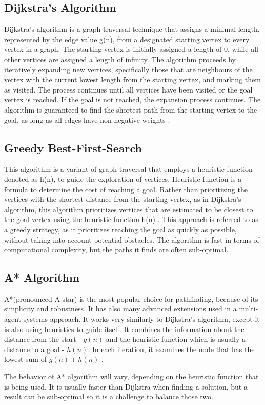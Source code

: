 \subsection{Dijkstra's Algorithm}
Dijkstra's algorithm is a graph traversal technique that assigns a minimal length, represented by the edge value g(n), from a designated starting vertex to every vertex in a graph. The starting vertex is initially assigned a length of 0, while all other vertices are assigned a length of infinity. The algorithm proceeds by iteratively expanding new vertices, specifically those that are neighbours of the vertex with the current lowest length from the starting vertex, and marking them as visited. The process continues until all vertices have been visited or the goal vertex is reached. If the goal is not reached, the expansion process continues. The algorithm is guaranteed to find the shortest path from the starting vertex to the goal, as long as all edges have non-negative weights \cite{basic_algorithms, basic_2}.

\subsection{Greedy Best-First-Search}
This algorithm is a variant of graph traversal that employs a heuristic function - denoted as h(n), to guide the exploration of vertices. Heuristic function is a formula to determine the cost of reaching a goal. Rather than prioritizing the vertices with the shortest distance from the starting vertex, as in Dijkstra's algorithm, this algorithm prioritizes vertices that are estimated to be closest to the goal vertex using the heuristic function h(n) 
  \cite{a_star_dijkstra}. This approach is referred to as a greedy strategy, as it prioritizes reaching the goal as quickly as possible, without taking into account potential obstacles. The algorithm is fast in terms of computational complexity, but the paths it finds are often sub-optimal.

\subsection{A* Algorithm}
A*(pronounced A star) is the most popular choice for pathfinding, because of its simplicity and robustness. It has also many advanced extensions used in a multi-agent systems approach. It works very similarly to Dijkstra's algorithm, except it is also using heuristics to guide itself. It combines the information about the distance from the start - \(g(n)\) and the heuristic function which is usually a distance to a goal - \(h(n)\). In each iteration, it examines the node that has the lowest sum of \(g(n) + h(n)\) \cite{basic_2}.

The behavior of A* algorithm will vary, depending on the heuristic function that is being used. It is usually faster than Dijkstra when finding a solution, but a result can be sub-optimal so it is a challenge to balance those two.
